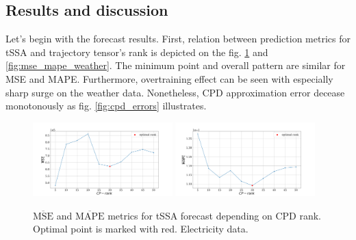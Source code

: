 	\subsection*{Results and discussion}
	
	Let's begin with the forecast results. First, relation between prediction metrics for tSSA and trajectory tensor's rank is depicted on the fig. \ref{fig:mse_mape_electr} and \ref{fig:mse_mape_weather}. The minimum point and overall pattern are similar for MSE and MAPE. Furthermore, overtraining effect can be seen with especially sharp surge on the weather data. Nonetheless, CPD approximation error decease monotonously as fig. \ref{fig:cpd_errors} illustrates.
	
	\begin{figure}[h]
		\centering
		\includegraphics[width=0.48\textwidth, keepaspectratio]{../../experiments/electricity/tssa/figs/prediction/MSE_rank.png}
		\includegraphics[width=0.48\textwidth, keepaspectratio]{../../experiments/electricity/tssa/figs/prediction/MAPE_rank.png}
		\caption{$ \overline{\text{MSE}} $ and $ \overline{\text{MAPE}} $ metrics for tSSA forecast depending on CPD rank. Optimal point is marked with red. Electricity data.}\label{fig:mse_mape_electr}
	\end{figure}
	
